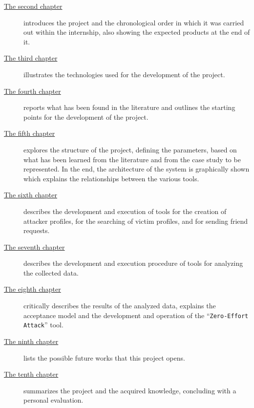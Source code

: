 \begin{description}
    \item[{\hyperref[cap:description-internship]{The second chapter}}] introduces the project and the chronological order in which it was carried out within the internship, also showing the expected products at the end of it.
    
    \item[{\hyperref[cap:background]{The third chapter}}] illustrates the technologies used for the development of the project.
    
    \item[{\hyperref[cap:literature-search]{The fourth chapter}}] reports what has been found in the literature and outlines the starting points for the development of the project.
    
    \item[{\hyperref[cap:structure-design]{The fifth chapter}}] explores the structure of the project, defining the parameters, based on what has been learned from the literature and from the case study to be represented. In the end, the architecture of the system is graphically shown which explains the relationships between the various tools.

    \item[{\hyperref[cap:tools]{The sixth chapter}}]  describes the development and execution of tools for the creation of attacker profiles, for the searching of victim profiles, and for sending friend requests.

	\item[{\hyperref[cap:data-collection]{The seventh chapter}}] describes the development and execution procedure of tools for analyzing the collected data.
    	
	\item[{\hyperref[cap:data-analysis]{The eighth chapter}}] critically describes the results of the analyzed data, explains the acceptance model and the development and operation of the ``\texttt{Zero-Effort Attack}'' tool.
	\item[{\hyperref[cap:future-works]{The ninth chapter}}] lists the possible future works that this project opens.
	
	\item[{\hyperref[cap:conclusions]{The tenth chapter}}] summarizes the project and the acquired knowledge, concluding with a personal evaluation.
\end{description}